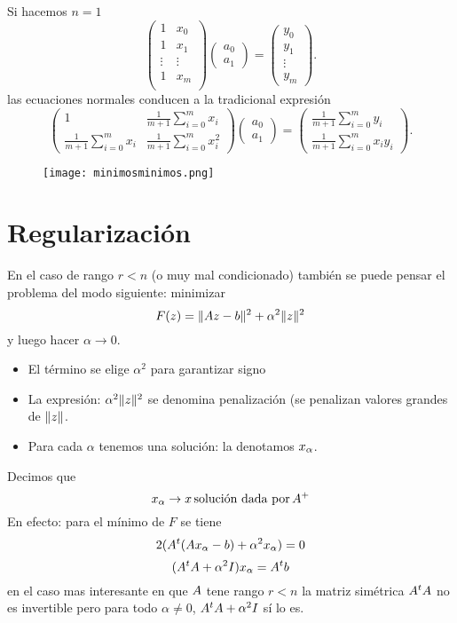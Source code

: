 Si hacemos $n=1$
$$
 \begin{pmatrix}
 1&x_{0}\\
 1&x_{1}\\
 \vdots&\vdots\\
 1&x_{m}\\
 \end{pmatrix}
 \begin{pmatrix}
 a_{0}\\
 a_{1}
 \end{pmatrix}=
 \begin{pmatrix}
y_{0}\\
 y_{1}\\
 \vdots\\
 y_{m}
 \end{pmatrix}.
 $$
las ecuaciones normales conducen a la tradicional expresión
$$
\begin{pmatrix}
1&\frac{1}{m+1}\sum_{i=0}^mx_i\\
\frac{1}{m+1}\sum_{i=0}^mx_i&\frac{1}{m+1}\sum_{i=0}^mx_i^2
\end{pmatrix}
\begin{pmatrix}
 a_{0}\\
 a_{1}
 \end{pmatrix}=
 \begin{pmatrix}
\frac{1}{m+1}\sum_{i=0}^my_i\\
 \frac{1}{m+1}\sum_{i=0}^mx_iy_i
 \end{pmatrix}.
$$

 \begin{figure}[h]
\centering\texttt{[image: minimosminimos.png]}
\end{figure}

\section{Regularización}

En el caso de rango $r<n$ (o muy mal condicionado) también se puede pensar el problema del modo siguiente: minimizar
 $$
 F(\zb)=\|\Ab\zb-\bb\|^2+\alpha^2\|\zb\|^2
 $$
 y luego hacer $\alpha\to 0$.

 \begin{itemize}
 \item  El término se elige $\alpha^2$ para garantizar signo
\item La expresión: $\alpha^2\|\zb\|^2$ se denomina penalización (se penalizan valores grandes de  $\|\zb\|$.
\item Para cada $\alpha$ tenemos una solución: la denotamos $\xb_\alpha$.
 \end{itemize}
 Decimos que
 $$
 \xb_\alpha\to \xb \, \mbox{solución dada por}\, \Ab^+
 $$
 En efecto: para el mínimo de $F$ se tiene
 $$
 2(\Ab^t(\Ab\xb_\alpha-\bb)+\alpha^2\xb_\alpha)=\cero
 $$
 $$
 (\Ab^t\Ab+\alpha^2 \Ib) \xb_\alpha=\Ab^t\bb
 $$
 en el caso mas interesante en que $\Ab$ tene rango $r<n$ la matriz simétrica $\Ab^t\Ab$
 no es invertible pero para todo $\alpha\neq 0$, $\Ab^t\Ab+\alpha^2 \Ib$ sí lo es.

